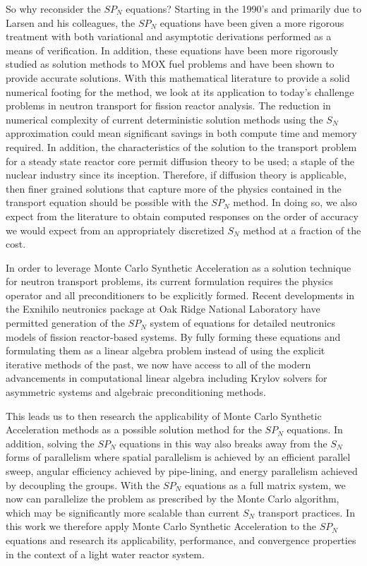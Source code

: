 So why reconsider the $SP_N$ equations? Starting in the 1990's and
primarily due to Larsen and his colleagues, the $SP_N$ equations have
been given a more rigorous treatment with both variational and
asymptotic derivations performed as a means of verification. In
addition, these equations have been more rigorously studied as
solution methods to MOX fuel problems and have been shown to provide
accurate solutions. With this mathematical literature to provide a
solid numerical footing for the method, we look at its application to
today's challenge problems in neutron transport for fission reactor
analysis. The reduction in numerical complexity of current
deterministic solution methods using the $S_N$ approximation could
mean significant savings in both compute time and memory required. In
addition, the characteristics of the solution to the transport problem
for a steady state reactor core permit diffusion theory to be used; a
staple of the nuclear industry since its inception. Therefore, if
diffusion theory is applicable, then finer grained solutions that
capture more of the physics contained in the transport equation should
be possible with the $SP_N$ method. In doing so, we also expect from
the literature to obtain computed responses on the order of accuracy
we would expect from an appropriately discretized $S_N$ method at a
fraction of the cost.

In order to leverage Monte Carlo Synthetic Acceleration as a solution
technique for neutron transport problems, its current formulation
requires the physics operator and all preconditioners to be explicitly
formed. Recent developments in the Exnihilo neutronics package at Oak
Ridge National Laboratory have permitted generation of the $SP_N$
system of equations for detailed neutronics models of fission
reactor-based systems\cite{evans_simpli_2013}. By fully forming these
equations and formulating them as a linear algebra problem instead of
using the explicit iterative methods of the past, we now have access
to all of the modern advancements in computational linear algebra
including Krylov solvers for asymmetric systems and algebraic
preconditioning methods. 

This leads us to then research the applicability of Monte Carlo
Synthetic Acceleration methods as a possible solution method for the
$SP_N$ equations. In addition, solving the $SP_N$ equations in this
way also breaks away from the $S_N$ forms of parallelism where spatial
parallelism is achieved by an efficient parallel sweep, angular
efficiency achieved by pipe-lining, and energy parallelism achieved by
decoupling the groups. With the $SP_N$ equations as a full matrix
system, we now can parallelize the problem as prescribed by the Monte
Carlo algorithm, which may be significantly more scalable than current
$S_N$ transport practices. In this work we therefore apply Monte Carlo
Synthetic Acceleration to the $SP_N$ equations and research its
applicability, performance, and convergence properties in the context
of a light water reactor system.

